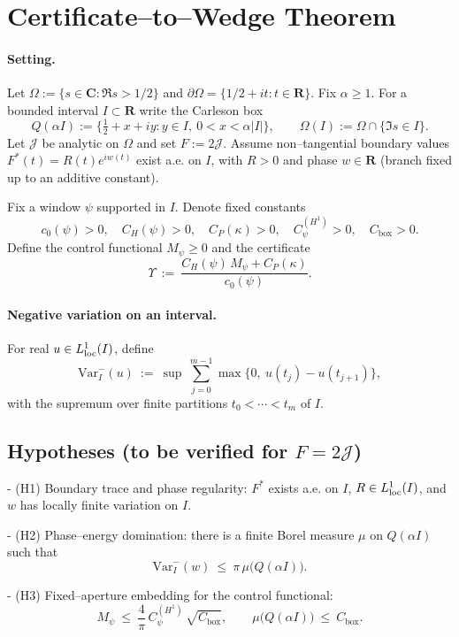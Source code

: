 
\section*{Certificate–to–Wedge Theorem}

\paragraph{Setting.}
Let $\Omega:=\{ s\in\mathbf C : \Re s>1/2\}$ and $\partial\Omega=\{1/2+it:t\in\mathbf R\}$. Fix $\alpha\ge1$. For a bounded interval $I\subset\mathbf R$ write the Carleson box
\[
Q(\alpha I):=\{\tfrac12+x+iy: y\in I,\ 0<x<\alpha|I|\},\qquad \Omega(I):=\Omega\cap\{\Im s\in I\}.
\]
Let $\mathcal J$ be analytic on $\Omega$ and set $F:=2\mathcal J$. Assume non–tangential boundary values $F^*(t)=R(t)e^{iw(t)}$ exist a.e. on $I$, with $R>0$ and phase $w\in\mathbf R$ (branch fixed up to an additive constant).

Fix a window $\psi$ supported in $I$. Denote fixed constants
\[c_0(\psi)>0,\quad C_H(\psi)>0,\quad C_P(\kappa)>0,\quad C_\psi^{(H^1)}>0,\quad C_{\mathrm{box}}>0.\]
Define the control functional $M_\psi\ge0$ and the certificate
\[\Upsilon\ :=\ \frac{C_H(\psi)\,M_\psi + C_P(\kappa)}{\,c_0(\psi)\,}.\]

\paragraph{Negative variation on an interval.}
For real $u\in L^1_{\rm loc}(I)$, define
\[\mathrm{Var}^{-}_{I}(u)\ :=\ \sup\ \sum_{j=0}^{m-1} \max\{0,\ u(t_j)-u(t_{j+1})\},\]
with the supremum over finite partitions $t_0<\cdots<t_m$ of $I$.

\subsection*{Hypotheses (to be verified for $F=2\mathcal J$)}

- (H1) Boundary trace and phase regularity: $F^*$ exists a.e. on $I$, $R\in L^1_{\rm loc}(I)$, and $w$ has locally finite variation on $I$.

- (H2) Phase–energy domination: there is a finite Borel measure $\mu$ on $Q(\alpha I)$ such that
\[\mathrm{Var}^{-}_{I}(w)\ \le\ \pi\,\mu\bigl(Q(\alpha I)\bigr).\]

- (H3) Fixed–aperture embedding for the control functional:
\[M_\psi\ \le\ \frac{4}{\pi}\,C_\psi^{(H^1)}\,\sqrt{C_{\mathrm{box}}},\qquad \mu\bigl(Q(\alpha I)\bigr)\ \le\ C_{\mathrm{box}}.\]

